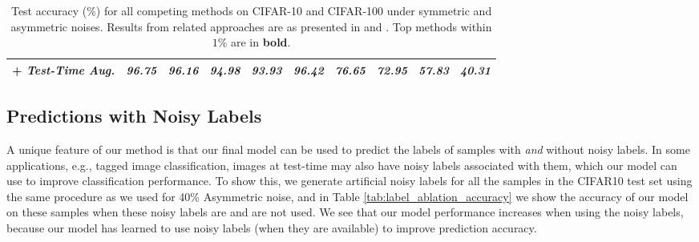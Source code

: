 \documentclass[10pt,twocolumn,letterpaper]{article}
\begin{document}
\begin{table}[t!]
\begin{center}
{\begin{tabular}{l|cccc|c||cccc}
            {\hskip 0.5cm} + \textit{Test-Time Aug.} & \textit{96.75} & \textit{96.16} & \textit{94.98} & \textit{93.93} & \textit{96.42} & \textit{76.65} & \textit{72.95} & \textit{57.83} & \textit{40.31} \\
            \bottomrule
        \end{tabular}
    }
    \end{center}
    \caption{Test accuracy (\%) for all competing methods on CIFAR-10 and CIFAR-100 under symmetric and asymmetric noises. Results from related approaches are as presented in \citep{li2020dividemix} and \cite{wu2021ngc}. Top methods within $1\%$ are in \textbf{bold}.} 
    \label{tab:results_cifar_2}
\end{table}

\subsection{Predictions with Noisy Labels}

A unique feature of our method is that our final model can be used to predict the labels of samples with \textit{and} without noisy labels. In some applications, e.g., tagged image classification, images at test-time may also have noisy labels associated with them, which our model can use to improve classification performance. To show this, we generate artificial noisy labels for all the samples in the CIFAR10 test set using the same procedure as we used for 40\% Asymmetric noise, and in Table \ref{tab:label_ablation_accuracy} we show the accuracy of our model on these samples when these noisy labels are and are not used. We see that our model performance  increases when using the noisy labels, because our model has learned to use noisy labels (when they are available) to improve prediction accuracy.

\begin{table}[t!]
    \begin{center}
    \end{center}
    \caption{\small Accuracy of our model tested with and without noisy labels on CIFAR10 Asym. 40\% noise. Noisy labels are generated for training and testing samples using the same procedure.} 
    \label{tab:label_ablation_accuracy}
\end{table}
\end{document}
